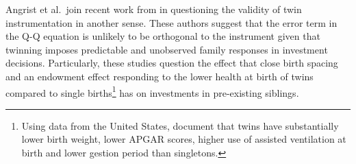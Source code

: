 Angrist et al.\ join recent work from \citet{RosenzweigZhang2009} in questioning the validity of twin instrumentation in another sense.  These authors suggest that the error term in the Q-Q equation is unlikely to be orthogonal to the instrument given that twinning imposes predictable and unobserved family responses in investment decisions.  Particularly, these studies question the effect that close birth spacing and an endowment effect responding to the lower health at birth of twins compared to single births\footnote{Using data from the United States, \citet{Almondetal2005} document that twins have substantially lower birth weight, lower APGAR scores, higher use of assisted ventilation at birth and lower gestion period than singletons.} has on investments in pre-existing siblings.

































